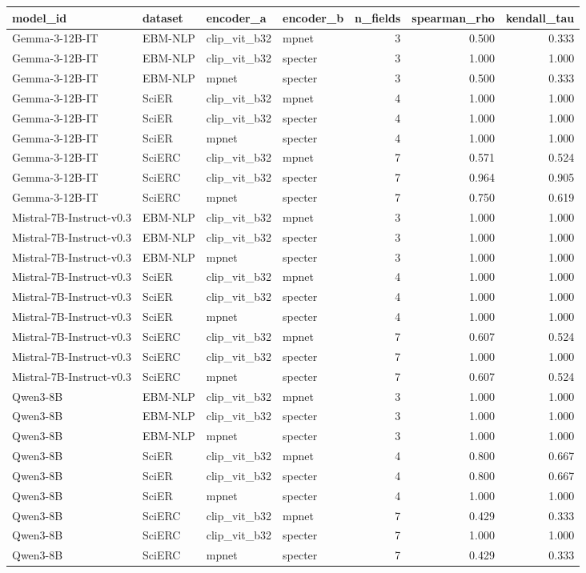 \begin{tabular}{llllrrr}
\toprule
model\_id & dataset & encoder\_a & encoder\_b & n\_fields & spearman\_rho & kendall\_tau \\
\midrule
Gemma-3-12B-IT & EBM-NLP & clip\_vit\_b32 & mpnet & 3 & 0.500 & 0.333 \\
Gemma-3-12B-IT & EBM-NLP & clip\_vit\_b32 & specter & 3 & 1.000 & 1.000 \\
Gemma-3-12B-IT & EBM-NLP & mpnet & specter & 3 & 0.500 & 0.333 \\
Gemma-3-12B-IT & SciER & clip\_vit\_b32 & mpnet & 4 & 1.000 & 1.000 \\
Gemma-3-12B-IT & SciER & clip\_vit\_b32 & specter & 4 & 1.000 & 1.000 \\
Gemma-3-12B-IT & SciER & mpnet & specter & 4 & 1.000 & 1.000 \\
Gemma-3-12B-IT & SciERC & clip\_vit\_b32 & mpnet & 7 & 0.571 & 0.524 \\
Gemma-3-12B-IT & SciERC & clip\_vit\_b32 & specter & 7 & 0.964 & 0.905 \\
Gemma-3-12B-IT & SciERC & mpnet & specter & 7 & 0.750 & 0.619 \\
Mistral-7B-Instruct-v0.3 & EBM-NLP & clip\_vit\_b32 & mpnet & 3 & 1.000 & 1.000 \\
Mistral-7B-Instruct-v0.3 & EBM-NLP & clip\_vit\_b32 & specter & 3 & 1.000 & 1.000 \\
Mistral-7B-Instruct-v0.3 & EBM-NLP & mpnet & specter & 3 & 1.000 & 1.000 \\
Mistral-7B-Instruct-v0.3 & SciER & clip\_vit\_b32 & mpnet & 4 & 1.000 & 1.000 \\
Mistral-7B-Instruct-v0.3 & SciER & clip\_vit\_b32 & specter & 4 & 1.000 & 1.000 \\
Mistral-7B-Instruct-v0.3 & SciER & mpnet & specter & 4 & 1.000 & 1.000 \\
Mistral-7B-Instruct-v0.3 & SciERC & clip\_vit\_b32 & mpnet & 7 & 0.607 & 0.524 \\
Mistral-7B-Instruct-v0.3 & SciERC & clip\_vit\_b32 & specter & 7 & 1.000 & 1.000 \\
Mistral-7B-Instruct-v0.3 & SciERC & mpnet & specter & 7 & 0.607 & 0.524 \\
Qwen3-8B & EBM-NLP & clip\_vit\_b32 & mpnet & 3 & 1.000 & 1.000 \\
Qwen3-8B & EBM-NLP & clip\_vit\_b32 & specter & 3 & 1.000 & 1.000 \\
Qwen3-8B & EBM-NLP & mpnet & specter & 3 & 1.000 & 1.000 \\
Qwen3-8B & SciER & clip\_vit\_b32 & mpnet & 4 & 0.800 & 0.667 \\
Qwen3-8B & SciER & clip\_vit\_b32 & specter & 4 & 0.800 & 0.667 \\
Qwen3-8B & SciER & mpnet & specter & 4 & 1.000 & 1.000 \\
Qwen3-8B & SciERC & clip\_vit\_b32 & mpnet & 7 & 0.429 & 0.333 \\
Qwen3-8B & SciERC & clip\_vit\_b32 & specter & 7 & 1.000 & 1.000 \\
Qwen3-8B & SciERC & mpnet & specter & 7 & 0.429 & 0.333 \\
\bottomrule
\end{tabular}
